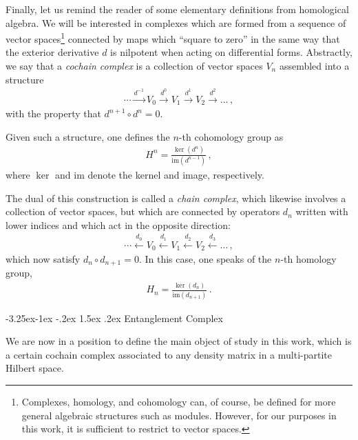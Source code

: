 \documentclass[12pt]{article}
\makeatletter
\renewcommand\subsection{\@startsection{subsection}{2}{\z@}%
                                     {-3.25ex\@plus -1ex \@minus -.2ex}%
                                     {1.5ex \@plus .2ex}%
                                     {\normalfont\bfseries}}
\numberwithin{equation}{section}
\makeatother
\begin{document}
Finally, let us remind the reader of some elementary definitions from homological algebra. We will be interested in complexes which are formed from a sequence of vector spaces\footnote{Complexes, homology, and cohomology can, of course, be defined for more general algebraic structures such as modules. However, for our purposes in this work, it is sufficient to restrict to vector spaces.} connected by maps which ``square to zero'' in the same way that the exterior derivative $d$ is nilpotent when acting on differential forms. Abstractly, we say that a \emph{cochain complex} is a collection of vector spaces $V_n$ assembled into a structure
%
\begin{align}\label{cochain_defn}
    \cdots \xrightarrow{d^{-1}} V_0 \xrightarrow{d^{0}} V_1 \xrightarrow{d^{1}} V_2 \xrightarrow{d^{2}} \ldots \, ,
\end{align}
%
with the property that $d^{n+1} \circ d^n = 0$.

Given such a structure, one defines the $n$-th cohomology group as
%
\begin{align}\label{cohomology_defn}
    H^n = \frac{\ker ( d^n ) }{\mathrm{im} ( d^{n-1} ) } \, ,
\end{align}
%
where $\ker$ and $\mathrm{im}$ denote the kernel and image, respectively. 

The dual of this construction is called a \emph{chain complex}, which likewise involves a collection of vector spaces, but which are connected by operators $d_n$ written with lower indices and which act in the opposite direction:
%
\begin{align}\label{chain_defn}
    \cdots \xleftarrow{d_0} V_0 \xleftarrow{d_{1}} V_1 \xleftarrow{d_2} V_2 \xleftarrow{d_3} \ldots \, ,
\end{align}
%
which now satisfy $d_n \circ d_{n+1} = 0$. In this case, one speaks of the $n$-th homology group,
%
\begin{align}
    H_n = \frac{\ker ( d_n ) }{\mathrm{im} ( d_{n+1} ) } \, .
\end{align}



\subsection{Entanglement Complex}

We are now in a position to define the main object of study in this work, which is a certain cochain complex associated to any density matrix in a multi-partite Hilbert space.
\end{document}
